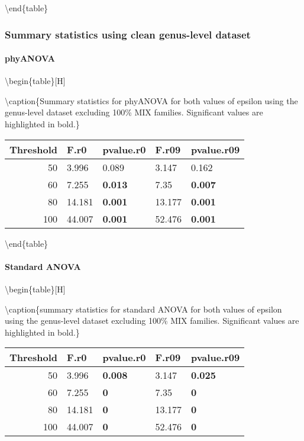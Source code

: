 \documentclass[]{article}
\let\oldparagraph\paragraph
\renewcommand{\paragraph}[1]{\oldparagraph{#1}\mbox{}}
\begin{document}
\textbackslash end\{table\}

\hypertarget{summary-statistics-using-clean-genus-level-dataset}{%
\subsubsection{Summary statistics using clean genus-level
dataset}\label{summary-statistics-using-clean-genus-level-dataset}}

\hypertarget{phyanova-4}{%
\paragraph{phyANOVA}\label{phyanova-4}}

\textbackslash begin\{table\}{[}H{]}

\textbackslash caption\{\label{tab:unnamed-chunk-24}Summary statistics
for phyANOVA for both values of epsilon using the genus-level dataset
excluding 100\% MIX families. Significant values are highlighted in
bold.\} \centering

\begin{tabular}{r|l|l|l|l}
\hline
Threshold & F.r0 & pvalue.r0 & F.r09 & pvalue.r09\\
\hline
50 & 3.996 & 0.089 & 3.147 & 0.162\\
\hline
60 & 7.255 & \textbf{0.013} & 7.35 & \textbf{0.007}\\
\hline
80 & 14.181 & \textbf{0.001} & 13.177 & \textbf{0.001}\\
\hline
100 & 44.007 & \textbf{0.001} & 52.476 & \textbf{0.001}\\
\hline
\end{tabular}

\textbackslash end\{table\}

\hypertarget{standard-anova-4}{%
\paragraph{Standard ANOVA}\label{standard-anova-4}}

\textbackslash begin\{table\}{[}H{]}

\textbackslash caption\{\label{tab:unnamed-chunk-25}summary statistics
for standard ANOVA for both values of epsilon using the genus-level
dataset excluding 100\% MIX families. Significant values are highlighted
in bold.\} \centering

\begin{tabular}{r|l|l|l|l}
\hline
Threshold & F.r0 & pvalue.r0 & F.r09 & pvalue.r09\\
\hline
50 & 3.996 & \textbf{0.008} & 3.147 & \textbf{0.025}\\
\hline
60 & 7.255 & \textbf{0} & 7.35 & \textbf{0}\\
\hline
80 & 14.181 & \textbf{0} & 13.177 & \textbf{0}\\
\hline
100 & 44.007 & \textbf{0} & 52.476 & \textbf{0}\\
\hline
\end{tabular}
\end{document}
